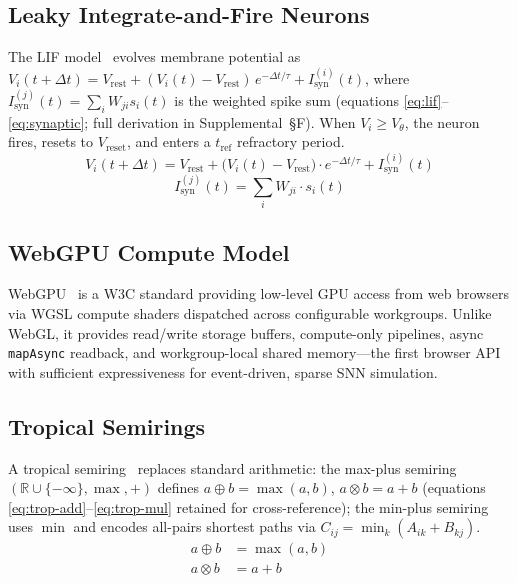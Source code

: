 \documentclass[10pt]{article}
\newcommand{\tropplus}{\oplus}
\newcommand{\tropmult}{\otimes}
\begin{document}
\subsection{Leaky Integrate-and-Fire Neurons}

The LIF model~\cite{gerstner2002spiking} evolves membrane potential as $V_i(t+\Delta t) = V_\mathrm{rest} + (V_i(t)-V_\mathrm{rest})\,e^{-\Delta t/\tau} + I_\mathrm{syn}^{(i)}(t)$, where $I_\mathrm{syn}^{(j)}(t) = \sum_i W_{ji} s_i(t)$ is the weighted spike sum (equations \eqref{eq:lif}--\eqref{eq:synaptic}; full derivation in Supplemental~\S{F}).
When $V_i \geq V_\theta$, the neuron fires, resets to $V_\mathrm{reset}$, and enters a $t_\mathrm{ref}$ refractory period.
\begin{equation}
\label{eq:lif}
V_i(t + \Delta t) = V_\mathrm{rest} + \bigl(V_i(t) - V_\mathrm{rest}\bigr) \cdot e^{-\Delta t / \tau} + I_\mathrm{syn}^{(i)}(t)
\end{equation}
\begin{equation}
\label{eq:synaptic}
I_\mathrm{syn}^{(j)}(t) = \sum_{i} W_{ji} \cdot s_i(t)
\end{equation}

\subsection{WebGPU Compute Model}

WebGPU~\cite{webgpu2024spec} is a W3C standard providing low-level GPU access from web browsers via WGSL compute shaders dispatched across configurable workgroups.
Unlike WebGL, it provides read/write storage buffers, compute-only pipelines, async \texttt{mapAsync} readback, and workgroup-local shared memory---the first browser API with sufficient expressiveness for event-driven, sparse SNN simulation.

\subsection{Tropical Semirings}

A tropical semiring~\cite{maclagan2015introduction} replaces standard arithmetic: the max-plus semiring $(\mathbb{R}\cup\{-\infty\}, \max, +)$ defines $a\tropplus b=\max(a,b)$, $a\tropmult b=a+b$ (equations \eqref{eq:trop-add}--\eqref{eq:trop-mul} retained for cross-reference); the min-plus semiring uses $\min$ and encodes all-pairs shortest paths via $C_{ij}=\min_k(A_{ik}+B_{kj})$.
\begin{align}
a \tropplus b &= \max(a, b) \label{eq:trop-add} \\
a \tropmult b &= a + b \label{eq:trop-mul}
\end{align}
\end{document}
